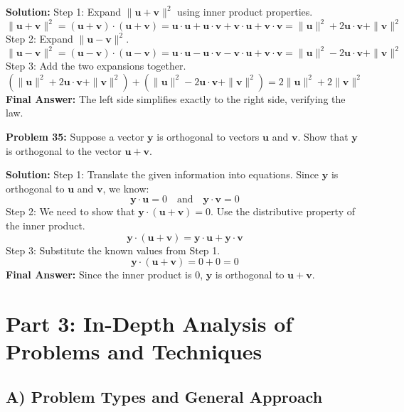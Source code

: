 \documentclass[11pt, letterpaper]{article}
\theoremstyle{definition}
\theoremstyle{remark}
\begin{document}
\textbf{Solution:}
Step 1: Expand $\|\mathbf{u} + \mathbf{v}\|^2$ using inner product properties.
\[ \|\mathbf{u} + \mathbf{v}\|^2 = (\mathbf{u} + \mathbf{v}) \cdot (\mathbf{u} + \mathbf{v}) = \mathbf{u} \cdot \mathbf{u} + \mathbf{u} \cdot \mathbf{v} + \mathbf{v} \cdot \mathbf{u} + \mathbf{v} \cdot \mathbf{v} = \|\mathbf{u}\|^2 + 2\mathbf{u} \cdot \mathbf{v} + \|\mathbf{v}\|^2 \]
Step 2: Expand $\|\mathbf{u} - \mathbf{v}\|^2$.
\[ \|\mathbf{u} - \mathbf{v}\|^2 = (\mathbf{u} - \mathbf{v}) \cdot (\mathbf{u} - \mathbf{v}) = \mathbf{u} \cdot \mathbf{u} - \mathbf{u} \cdot \mathbf{v} - \mathbf{v} \cdot \mathbf{u} + \mathbf{v} \cdot \mathbf{v} = \|\mathbf{u}\|^2 - 2\mathbf{u} \cdot \mathbf{v} + \|\mathbf{v}\|^2 \]
Step 3: Add the two expansions together.
\[ (\|\mathbf{u}\|^2 + 2\mathbf{u} \cdot \mathbf{v} + \|\mathbf{v}\|^2) + (\|\mathbf{u}\|^2 - 2\mathbf{u} \cdot \mathbf{v} + \|\mathbf{v}\|^2) = 2\|\mathbf{u}\|^2 + 2\|\mathbf{v}\|^2 \]
\textbf{Final Answer:} The left side simplifies exactly to the right side, verifying the law.

\vspace{1em}
\textbf{Problem 35:} Suppose a vector $\mathbf{y}$ is orthogonal to vectors $\mathbf{u}$ and $\mathbf{v}$. Show that $\mathbf{y}$ is orthogonal to the vector $\mathbf{u} + \mathbf{v}$.

\textbf{Solution:}
Step 1: Translate the given information into equations. Since $\mathbf{y}$ is orthogonal to $\mathbf{u}$ and $\mathbf{v}$, we know:
\[ \mathbf{y} \cdot \mathbf{u} = 0 \quad \text{and} \quad \mathbf{y} \cdot \mathbf{v} = 0 \]
Step 2: We need to show that $\mathbf{y} \cdot (\mathbf{u} + \mathbf{v}) = 0$. Use the distributive property of the inner product.
\[ \mathbf{y} \cdot (\mathbf{u} + \mathbf{v}) = \mathbf{y} \cdot \mathbf{u} + \mathbf{y} \cdot \mathbf{v} \]
Step 3: Substitute the known values from Step 1.
\[ \mathbf{y} \cdot (\mathbf{u} + \mathbf{v}) = 0 + 0 = 0 \]
\textbf{Final Answer:} Since the inner product is $0$, $\mathbf{y}$ is orthogonal to $\mathbf{u} + \mathbf{v}$.

\newpage
\section{Part 3: In-Depth Analysis of Problems and Techniques}

\subsection{A) Problem Types and General Approach}
\end{document}
